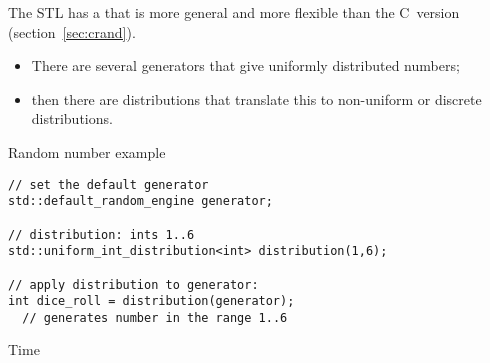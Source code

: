 The \ac{STL} has a
that is more general and more flexible than the C~version (section~\ref{sec:crand}).
\begin{itemize}
\item There are several generators that give uniformly distributed
  numbers;
\item then there are distributions that translate this to non-uniform
  or discrete distributions.
\end{itemize}

\begin{block}{Random number example}
  \label{sl:stl:rand16}
\begin{lstlisting}
// set the default generator
std::default_random_engine generator;

// distribution: ints 1..6
std::uniform_int_distribution<int> distribution(1,6);

// apply distribution to generator:
int dice_roll = distribution(generator);
  // generates number in the range 1..6 
\end{lstlisting}
\end{block}

 {Time}

